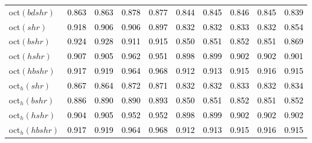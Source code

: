 \begin{tabular}[t]{l|ccccccccc}
oct$(bdshr)$ & \textcolor{black}{0.863} & \textcolor{black}{0.863} & \textcolor{black}{0.878} & \textcolor{black}{0.877} & \textcolor{black}{0.844} & \textcolor{black}{0.845} & \textcolor{black}{0.846} & \textcolor{black}{0.845} & \textcolor{black}{0.839}\\
oct$(shr)$ & \textcolor{black}{0.918} & \textcolor{black}{0.906} & \textcolor{black}{0.906} & \textcolor{black}{0.897} & \textcolor{black}{0.832} & \textcolor{black}{0.832} & \textcolor{black}{0.833} & \textcolor{black}{0.832} & \textcolor{black}{0.854}\\
oct$(bshr)$ & \textcolor{black}{0.924} & \textcolor{black}{0.928} & \textcolor{black}{0.911} & \textcolor{black}{0.915} & \textcolor{black}{0.850} & \textcolor{black}{0.851} & \textcolor{black}{0.852} & \textcolor{black}{0.851} & \textcolor{black}{0.869}\\
oct$(hshr)$ & \textcolor{black}{0.907} & \textcolor{black}{0.905} & \textcolor{black}{0.962} & \textcolor{black}{0.951} & \textcolor{black}{0.898} & \textcolor{black}{0.899} & \textcolor{black}{0.902} & \textcolor{black}{0.902} & \textcolor{black}{0.901}\\
oct$(hbshr)$ & \textcolor{black}{0.917} & \textcolor{black}{0.919} & \textcolor{black}{0.964} & \textcolor{black}{0.968} & \textcolor{black}{0.912} & \textcolor{black}{0.913} & \textcolor{black}{0.915} & \textcolor{black}{0.916} & \textcolor{black}{0.915}\\
oct$_h(shr)$ & \textcolor{black}{0.867} & \textcolor{black}{0.864} & \textcolor{black}{0.872} & \textcolor{black}{0.871} & \textcolor{black}{0.832} & \textcolor{black}{0.832} & \textcolor{black}{0.833} & \textcolor{black}{0.832} & \textcolor{black}{0.834}\\
oct$_h(bshr)$ & \textcolor{black}{0.886} & \textcolor{black}{0.890} & \textcolor{black}{0.890} & \textcolor{black}{0.893} & \textcolor{black}{0.850} & \textcolor{black}{0.851} & \textcolor{black}{0.852} & \textcolor{black}{0.851} & \textcolor{black}{0.852}\\
oct$_h(hshr)$ & \textcolor{black}{0.904} & \textcolor{black}{0.905} & \textcolor{black}{0.952} & \textcolor{black}{0.952} & \textcolor{black}{0.898} & \textcolor{black}{0.899} & \textcolor{black}{0.902} & \textcolor{black}{0.902} & \textcolor{black}{0.902}\\
oct$_h(hbshr)$ & \textcolor{black}{0.917} & \textcolor{black}{0.919} & \textcolor{black}{0.964} & \textcolor{black}{0.968} & \textcolor{black}{0.912} & \textcolor{black}{0.913} & \textcolor{black}{0.915} & \textcolor{black}{0.916} & \textcolor{black}{0.915}\\
\bottomrule
\end{tabular}
